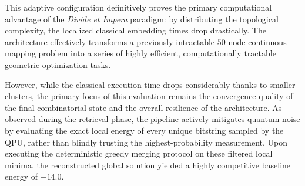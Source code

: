 \begin{table}[H]
    \centering
    \caption{Adaptive thermodynamic hyperparameter configuration deployed for the fragmented $50\times50$ QUBO instance.}
    \label{tab:sa_params_50x50}
\end{table}

This adaptive configuration definitively proves the primary computational advantage of the \textit{Divide et Impera} paradigm: by distributing the topological complexity, the localized classical embedding times drop drastically. The architecture effectively transforms a previously intractable $50$-node continuous mapping problem into a series of highly efficient, computationally tractable geometric optimization tasks.

However, while the classical execution time drops considerably thanks to smaller clusters, the primary focus of this evaluation remains the convergence quality of the final combinatorial state and the overall resilience of the architecture. As observed during the retrieval phase, the pipeline actively mitigates quantum noise by evaluating the exact local energy of every unique bitstring sampled by the QPU, rather than blindly trusting the highest-probability measurement. Upon executing the deterministic greedy merging protocol on these filtered local minima, the reconstructed global solution yielded a highly competitive baseline energy of $-14.0$. 

